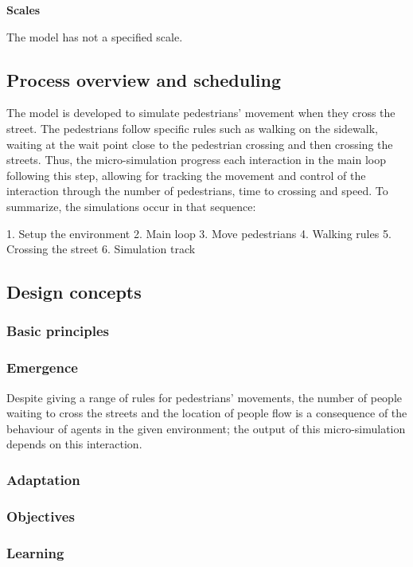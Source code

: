 \documentclass[10pt]{report}
\numberwithin{figure}{section}
\numberwithin{table}{section}
\begin{document}
\newpage

\textbf{Scales}

The model has not a specified scale. 

\subsection{Process overview and scheduling}


The model is developed to simulate pedestrians' movement when they cross the street. The pedestrians follow specific rules such as walking on the sidewalk, waiting at the wait point close to the pedestrian crossing and then crossing the streets. Thus, the micro-simulation progress each interaction in the main loop following this step, allowing for tracking the movement and control of the interaction through the number of pedestrians, time to crossing and speed. To summarize, the simulations occur in that sequence:

1. Setup the environment
2. Main loop
3. Move pedestrians
4. Walking rules
5. Crossing the street
6. Simulation track


\subsection{Design concepts}

\subsubsection{Basic principles}

\subsubsection{Emergence}
 Despite giving a range of rules for pedestrians' movements, the number of people waiting to cross the streets and the location of people flow is a consequence of the behaviour of agents in the given environment; the output of this micro-simulation depends on this interaction. 
 
\subsubsection{Adaptation}

\subsubsection{Objectives}

\subsubsection{Learning}
\end{document}

